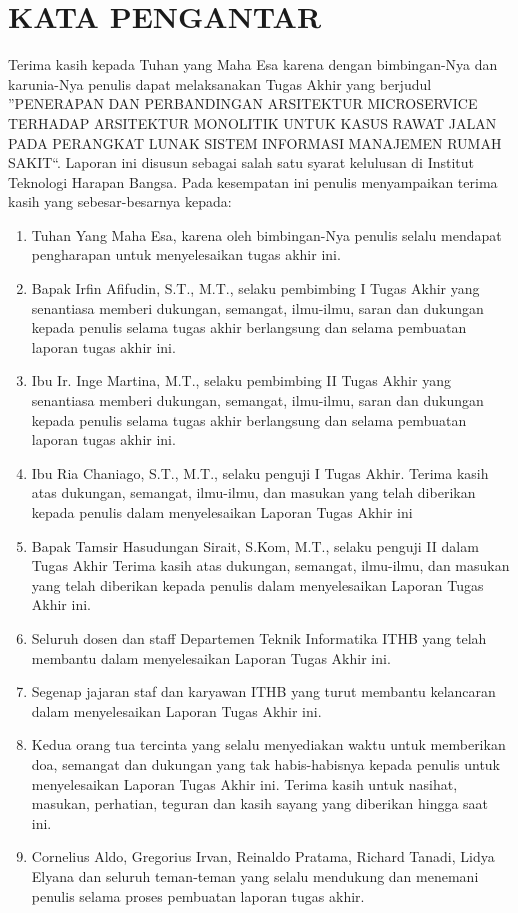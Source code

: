 \chapter*{KATA PENGANTAR}
{\raggedleft Terima kasih kepada Tuhan yang Maha Esa karena dengan bimbingan-Nya dan karunia-Nya penulis dapat melaksanakan Tugas Akhir yang berjudul \textquotedblright PENERAPAN DAN PERBANDINGAN ARSITEKTUR MICROSERVICE TERHADAP ARSITEKTUR MONOLITIK UNTUK KASUS RAWAT JALAN PADA PERANGKAT LUNAK SISTEM INFORMASI MANAJEMEN RUMAH SAKIT\textquotedblleft. Laporan ini disusun sebagai salah satu syarat kelulusan di Institut Teknologi Harapan Bangsa. Pada kesempatan ini penulis menyampaikan terima kasih yang sebesar-besarnya kepada:} \\
\begin{enumerate}
\item Tuhan Yang Maha Esa, karena oleh bimbingan-Nya penulis selalu mendapat pengharapan untuk menyelesaikan tugas akhir ini.
\item Bapak Irfin Afifudin, S.T., M.T., selaku pembimbing I Tugas Akhir yang  senantiasa memberi dukungan, semangat, ilmu-ilmu, saran dan dukungan kepada penulis selama tugas akhir berlangsung dan selama pembuatan laporan tugas akhir ini.
\item Ibu Ir. Inge Martina, M.T., selaku pembimbing II Tugas Akhir yang  senantiasa memberi dukungan, semangat, ilmu-ilmu, saran dan dukungan kepada penulis selama tugas akhir berlangsung dan selama pembuatan laporan tugas akhir ini.
\item Ibu Ria Chaniago, S.T., M.T., selaku penguji I Tugas Akhir. Terima kasih atas dukungan, semangat, ilmu-ilmu, dan masukan yang telah diberikan kepada penulis dalam menyelesaikan Laporan Tugas Akhir ini
\item Bapak Tamsir Hasudungan Sirait, S.Kom, M.T., selaku penguji II dalam Tugas Akhir Terima kasih atas dukungan, semangat, ilmu-ilmu, dan masukan yang telah diberikan kepada penulis dalam menyelesaikan Laporan Tugas Akhir ini.
\item Seluruh dosen dan staff Departemen Teknik Informatika ITHB yang telah membantu dalam menyelesaikan Laporan Tugas Akhir ini.
\item Segenap jajaran staf dan karyawan ITHB yang turut membantu kelancaran dalam menyelesaikan Laporan Tugas Akhir ini.
\item Kedua orang tua tercinta yang selalu menyediakan waktu untuk memberikan doa, semangat dan dukungan yang tak habis-habisnya kepada penulis untuk menyelesaikan Laporan Tugas Akhir ini. Terima kasih untuk nasihat, masukan, perhatian, teguran dan kasih sayang yang diberikan hingga saat ini.
\item Cornelius Aldo, Gregorius Irvan, Reinaldo Pratama, Richard Tanadi, Lidya Elyana dan seluruh teman-teman yang selalu mendukung dan menemani penulis selama proses pembuatan laporan tugas akhir.
\\
\end{enumerate}
